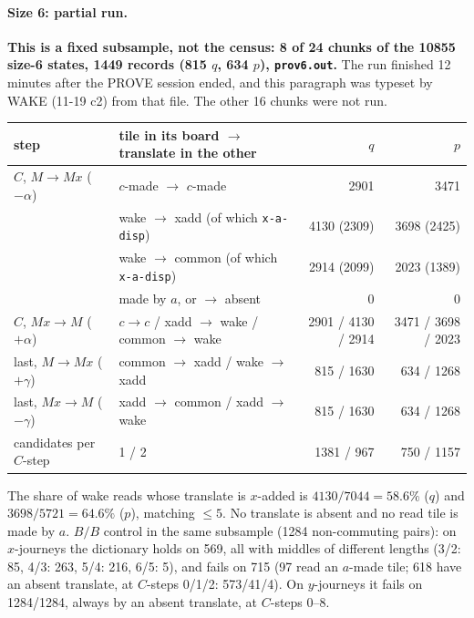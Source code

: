 \documentclass[11pt]{article}
\theoremstyle{definition}\newtheorem{definition}[theorem]{Definition}\newtheorem{remark}[theorem]{Remark}
\begin{document}
\paragraph{Size 6: partial run.} \textbf{This is a fixed subsample, not the census: 8 of 24 chunks of the 10855 size-6 states, 1449 records (815 $q$, 634 $p$), \texttt{prov6.out}.} The run finished 12 minutes after the PROVE session ended, and this paragraph was typeset by WAKE (11-19 c2) from that file. The other 16 chunks were not run.
\begin{center}\begin{tabular}{llrr}\toprule
step & tile in its board $\to$ translate in the other & $q$ & $p$\\\midrule
$C$, $M\to Mx$ ($-\alpha$) & $c$-made $\to$ $c$-made & 2901 & 3471\\
& wake $\to$ xadd (of which \texttt{x-a-disp}) & 4130 (2309) & 3698 (2425)\\
& wake $\to$ common (of which \texttt{x-a-disp}) & 2914 (2099) & 2023 (1389)\\
& made by $a$, or $\to$ absent & 0 & 0\\
$C$, $Mx\to M$ ($+\alpha$) & $c\to c$ / xadd $\to$ wake / common $\to$ wake & 2901 / 4130 / 2914 & 3471 / 3698 / 2023\\
last, $M\to Mx$ ($+\gamma$) & common $\to$ xadd / wake $\to$ xadd & 815 / 1630 & 634 / 1268\\
last, $Mx\to M$ ($-\gamma$) & xadd $\to$ common / xadd $\to$ wake & 815 / 1630 & 634 / 1268\\\midrule
candidates per $C$-step & 1 / 2 & 1381 / 967 & 750 / 1157\\\bottomrule
\end{tabular}\end{center}
The share of wake reads whose translate is $x$-added is $4130/7044=58.6\%$ ($q$) and $3698/5721=64.6\%$ ($p$), matching $\le5$. No translate is absent and no read tile is made by $a$.
$B/B$ control in the same subsample (1284 non-commuting pairs): on $x$-journeys the dictionary holds on 569, all with middles of different lengths (3/2: 85, 4/3: 263, 5/4: 216, 6/5: 5), and fails on 715 (97 read an $a$-made tile; 618 have an absent translate, at $C$-steps 0/1/2: 573/41/4). On $y$-journeys it fails on 1284/1284, always by an absent translate, at $C$-steps 0--8.
\end{document}
